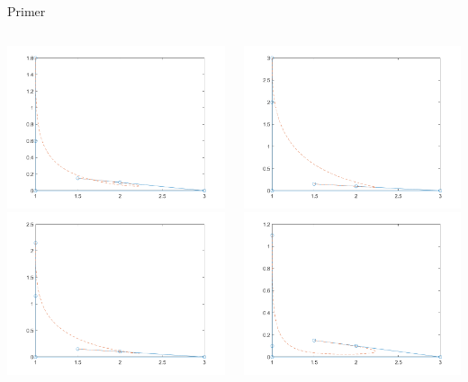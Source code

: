 \documentclass{beamer} %
\begin{document}
\begin{frame}{Primer}
	\begin{columns}[T]
		\begin{center}
		\includegraphics[width=0.6\columnwidth]{bloop.png}
		\includegraphics[width=0.6\columnwidth]{bcusp.png}
	\end{center}
		\begin{center}
		\includegraphics[width=0.6\columnwidth]{bprevoj.png}
		\includegraphics[width=0.6\columnwidth]{bno_sing.png}
		\end{center}
	\end{columns}
	
\end{frame}
\end{document}
